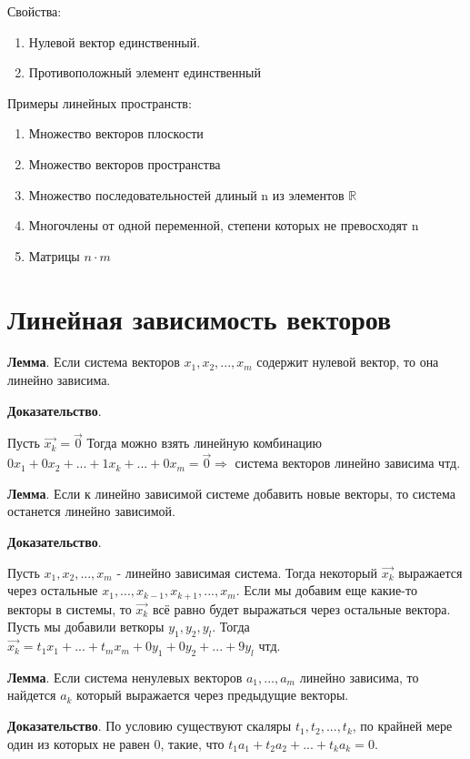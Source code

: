 \documentclass[a4paper]{article}
\begin{document}
{\begin{small}
Свойства:
\begin{enumerate}
\item Нулевой вектор единственный.
\item Противоположный элемент единственный
\end{enumerate}

Примеры линейных пространств:
\begin{enumerate}
\item Множество векторов плоскости
\item Множество векторов пространства
\item Множество последовательностей длиный n из элементов $\mathbb{R}$
\item Многочлены от одной переменной, степени которых не превосходят n
\item Матрицы $n \cdot m$
\end{enumerate}

\section*{Линейная зависимость векторов}
\textbf{Лемма}. Если система векторов $x_1, x_2, ..., x_m$ содержит нулевой вектор, то она линейно зависима.

\textbf{Доказательство}. 

Пусть $\vec{x_k} = \vec{0}$
Тогда можно взять линейную комбинацию $0x_1 + 0x_2 + ... + 1x_k + ... + 0x_m = \vec{0} \Rightarrow$ система векторов линейно зависима чтд.

\textbf{Лемма}. Если к линейно зависимой системе добавить новые векторы, то система останется линейно зависимой.

\textbf{Доказательство}. 

Пусть  $x_1, x_2, ..., x_m$ - линейно зависимая система. Тогда некоторый $\vec{x_k}$ выражается через остальные $x_1, ..., x_{k-1}, x_{k+1}, ..., x_m$. Если мы добавим еще какие-то векторы в системы, то $\vec{x_k}$ всё равно будет выражаться через остальные вектора. Пусть мы добавили веткоры $y_1, y_2, y_l$. Тогда $\vec{x_k} = t_1x_1 + ... + t_mx_m + 0y_1 +0y_2 + ... + 9y_l$ чтд.


\textbf{Лемма}. Если система ненулевых векторов $a_1, ..., a_m$ линейно зависима, то найдется $a_k$ который выражается через предыдущие векторы.

\textbf{Доказательство}. По условию существуют скаляры $t_1, t_2, ..., t_k$, по крайней мере один из которых не равен 0, такие, что $t_1a_1 + t_2a_2 + ... + t_ka_k = 0$.


\end{small}}
\end{document}
